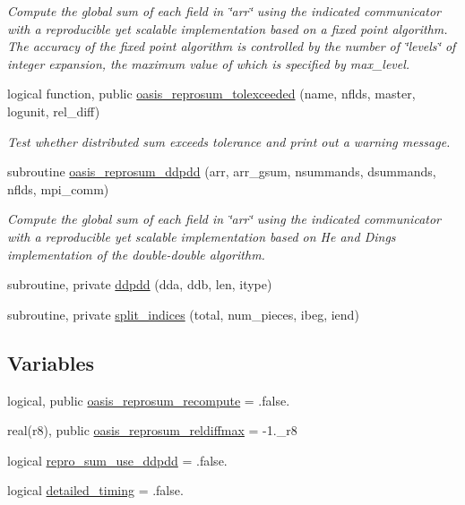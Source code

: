 \begin{DoxyCompactItemize}
\begin{DoxyCompactList}\small\item\em Compute the global sum of each field in \char`\"{}arr\char`\"{} using the indicated communicator with a reproducible yet scalable implementation based on a fixed point algorithm. The accuracy of the fixed point algorithm is controlled by the number of \char`\"{}levels\char`\"{} of integer expansion, the maximum value of which is specified by max\+\_\+level. \end{DoxyCompactList}\item 
logical function, public \hyperlink{namespacemod__oasis__reprosum_a0f773341a7a6883b2f65d395a6b25b08}{oasis\+\_\+reprosum\+\_\+tolexceeded} (name, nflds, master, logunit, rel\+\_\+diff)
\begin{DoxyCompactList}\small\item\em Test whether distributed sum exceeds tolerance and print out a warning message. \end{DoxyCompactList}\item 
subroutine \hyperlink{namespacemod__oasis__reprosum_afe237975bf8e718f32523c3929911102}{oasis\+\_\+reprosum\+\_\+ddpdd} (arr, arr\+\_\+gsum, nsummands, dsummands, nflds, mpi\+\_\+comm)
\begin{DoxyCompactList}\small\item\em Compute the global sum of each field in \char`\"{}arr\char`\"{} using the indicated communicator with a reproducible yet scalable implementation based on He and Ding\textquotesingle{}s implementation of the double-\/double algorithm. \end{DoxyCompactList}\item 
subroutine, private \hyperlink{namespacemod__oasis__reprosum_a24f9efa3ca739811888206eaf71d4690}{ddpdd} (dda, ddb, len, itype)
\item 
subroutine, private \hyperlink{namespacemod__oasis__reprosum_affb09b4ec9b001bf2ebbc51feebd8004}{split\+\_\+indices} (total, num\+\_\+pieces, ibeg, iend)
\end{DoxyCompactItemize}
\subsection*{Variables}
\begin{DoxyCompactItemize}
\item 
logical, public \hyperlink{namespacemod__oasis__reprosum_a89140c250e34a903bc9aa546574988d6}{oasis\+\_\+reprosum\+\_\+recompute} = .false.
\item 
real(r8), public \hyperlink{namespacemod__oasis__reprosum_a6a80f4226d35d0842617e6eb6c9406e1}{oasis\+\_\+reprosum\+\_\+reldiffmax} = -\/1.\+\_\+r8
\item 
logical \hyperlink{namespacemod__oasis__reprosum_aab06d0de9a82726d347ac52bb276355d}{repro\+\_\+sum\+\_\+use\+\_\+ddpdd} = .false.
\item 
logical \hyperlink{namespacemod__oasis__reprosum_a48a084c213295b9eaa78c0552a10741a}{detailed\+\_\+timing} = .false.
\end{DoxyCompactItemize}


